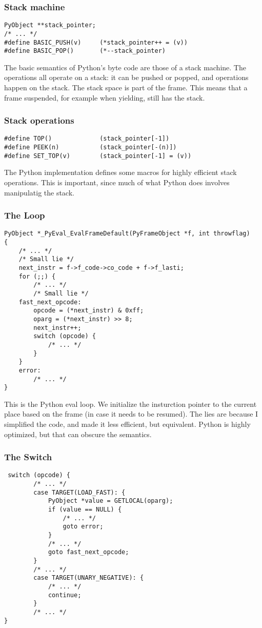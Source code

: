 \begin{frame}
\frametitle{Stack machine}

\begin{lstlisting}
PyObject **stack_pointer;
/* ... */
#define BASIC_PUSH(v)     (*stack_pointer++ = (v))
#define BASIC_POP()       (*--stack_pointer)
\end{lstlisting}
\end{frame}

The basic semantics of Python's byte code are those of a stack machine.
The operations all operate on a stack:
it can be pushed or popped,
and operations happen on the stack.
The stack space is part of the frame.
This means that a frame suspended,
for example when yielding,
still has the stack.

\begin{frame}
\frametitle{Stack operations}

\begin{lstlisting}
#define TOP()             (stack_pointer[-1])
#define PEEK(n)           (stack_pointer[-(n)])
#define SET_TOP(v)        (stack_pointer[-1] = (v))
\end{lstlisting}
\end{frame}

The Python implementation defines some macros for highly
efficient stack operations. This is important,
since much of what Python does involves manipulatig the
stack.

\begin{frame}[fragile]
\frametitle{The Loop}

\begin{lstlisting}
PyObject *_PyEval_EvalFrameDefault(PyFrameObject *f, int throwflag)
{
    /* ... */
    /* Small lie */
    next_instr = f->f_code->co_code + f->f_lasti;
    for (;;) {
        /* ... */
        /* Small lie */
    fast_next_opcode:
        opcode = (*next_instr) & 0xff;
        oparg = (*next_instr) >> 8;
        next_instr++;
        switch (opcode) {
            /* ... */
        }
    }
    error:
        /* ... */
}
\end{lstlisting}
\end{frame}

This is the Python eval loop.
We initialize the insturction pointer to the current place based
on the frame
(in case it needs to be resumed).
The lies are because I simplified the code, and made it less efficient,
but equivalent. Python is highly optimized, but that can obscure
the semantics.


\begin{frame}
\frametitle{The Switch}
\begin{lstlisting}
 switch (opcode) {
        /* ... */
        case TARGET(LOAD_FAST): {
            PyObject *value = GETLOCAL(oparg);
            if (value == NULL) {
                /* ... */
                goto error;
            }
            /* ... */
            goto fast_next_opcode;
        }
        /* ... */
        case TARGET(UNARY_NEGATIVE): {
            /* ... */
            continue;
        }
        /* ... */
}
\end{lstlisting}
\end{frame}


